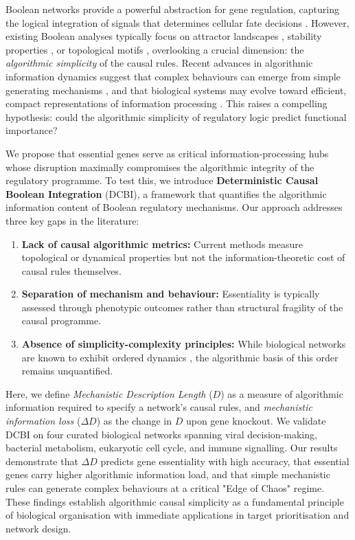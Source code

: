 \documentclass[12pt]{article}
\begin{document}
Boolean networks provide a powerful abstraction for gene regulation, capturing the logical integration of signals that determines cellular fate decisions \cite{Kauffman1969, Wang2012}. However, existing Boolean analyses typically focus on attractor landscapes \cite{Zanudo2017}, stability properties \cite{Shmulevich2003}, or topological motifs \cite{Milo2002}, overlooking a crucial dimension: the \textit{algorithmic simplicity} of the causal rules. Recent advances in algorithmic information dynamics suggest that complex behaviours can emerge from simple generating mechanisms \cite{Zenil2018}, and that biological systems may evolve toward efficient, compact representations of information processing \cite{Zenil2019}. This raises a compelling hypothesis: could the algorithmic simplicity of regulatory logic predict functional importance?

We propose that essential genes serve as critical information-processing hubs whose disruption maximally compromises the algorithmic integrity of the regulatory programme. To test this, we introduce \textbf{Deterministic Causal Boolean Integration} (DCBI), a framework that quantifies the algorithmic information content of Boolean regulatory mechanisms. Our approach addresses three key gaps in the literature:

\begin{enumerate}
    \item \textbf{Lack of causal algorithmic metrics:} Current methods measure topological or dynamical properties but not the information-theoretic cost of causal rules themselves.
    \item \textbf{Separation of mechanism and behaviour:} Essentiality is typically assessed through phenotypic outcomes rather than structural fragility of the causal programme.
    \item \textbf{Absence of simplicity-complexity principles:} While biological networks are known to exhibit ordered dynamics \cite{Kauffman1993}, the algorithmic basis of this order remains unquantified.
\end{enumerate}

Here, we define \textit{Mechanistic Description Length} (\(D\)) as a measure of algorithmic information required to specify a network's causal rules, and \textit{mechanistic information loss} (\(\Delta D\)) as the change in \(D\) upon gene knockout. We validate DCBI on four curated biological networks spanning viral decision-making, bacterial metabolism, eukaryotic cell cycle, and immune signalling. Our results demonstrate that \(\Delta D\) predicts gene essentiality with high accuracy, that essential genes carry higher algorithmic information load, and that simple mechanistic rules can generate complex behaviours at a critical "Edge of Chaos" regime. These findings establish algorithmic causal simplicity as a fundamental principle of biological organisation with immediate applications in target prioritisation and network design.
\end{document}
